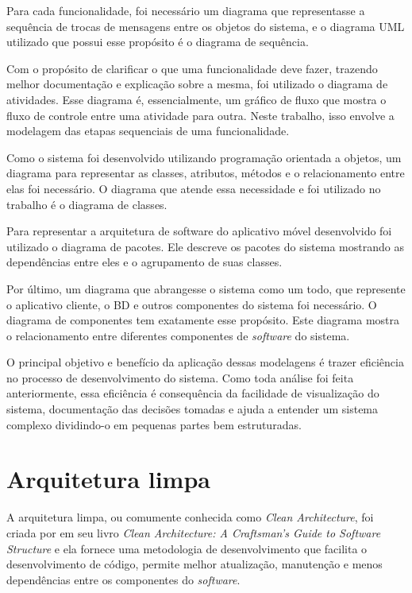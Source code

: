 Para cada funcionalidade, foi necessário um diagrama que representasse a sequência de trocas de mensagens entre os objetos do sistema, e o diagrama UML utilizado que possui esse propósito é o diagrama de sequência.

Com o propósito de clarificar o que uma funcionalidade deve fazer, trazendo melhor documentação e explicação sobre a mesma, foi utilizado o diagrama de atividades. Esse diagrama é, essencialmente, um gráfico de fluxo que mostra o fluxo de controle entre uma atividade para outra. Neste trabalho, isso envolve a modelagem das etapas sequenciais de uma funcionalidade.

Como o sistema foi desenvolvido utilizando programação orientada a objetos, um diagrama para representar as classes, atributos, métodos e o relacionamento entre elas foi necessário. O diagrama que atende essa necessidade e foi utilizado no trabalho é o diagrama de classes.

Para representar a arquitetura de software do aplicativo móvel desenvolvido foi utilizado o diagrama de pacotes. Ele descreve os pacotes do sistema mostrando as dependências entre eles e o agrupamento de suas classes.

Por último, um diagrama que abrangesse o sistema como um todo, que represente o aplicativo cliente, o BD e outros componentes do sistema foi necessário. O diagrama de componentes tem exatamente esse propósito. Este diagrama mostra o relacionamento entre diferentes componentes de \textit{software} do sistema.

O principal objetivo e benefício da aplicação dessas modelagens é trazer eficiência no processo de desenvolvimento do sistema. Como toda análise foi feita anteriormente, essa eficiência é consequência da facilidade de visualização do sistema, documentação das decisões tomadas e ajuda a entender um sistema complexo dividindo-o em pequenas partes bem estruturadas.

\section{Arquitetura limpa}\label{sec:clean}

A arquitetura limpa, ou comumente conhecida como \textit{Clean Architecture}, foi criada por \textcite{cleanarchitecture} em seu livro \textit{Clean Architecture: A Craftsman’s Guide to Software Structure} e ela fornece uma metodologia de desenvolvimento que facilita o desenvolvimento de código, permite melhor atualização, manutenção e menos dependências entre os componentes do \textit{software}.

